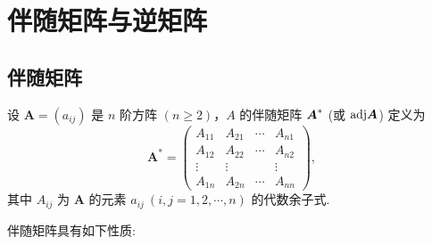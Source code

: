 \section{伴随矩阵与逆矩阵}

\subsection{伴随矩阵}

\begin{definition}[伴随矩阵]
    设 $ \boldsymbol{A}=\left(a_{i j}\right) $ 是 $ n $ 阶方阵 $ (n \geqslant 2)$，$A $ 的伴随矩阵 $\vb*{A}^*$ (或 $\mathrm{adj}\vb*{A}$) 定义为
    $$\boldsymbol{A}^{*}=\begin{pmatrix}
            A_{11}  & A_{21}  & \cdots & A_{n 1} \\
            A_{12}  & A_{22}  & \cdots & A_{n 2} \\
            \vdots  & \vdots  &        & \vdots  \\
            A_{1 n} & A_{2 n} & \cdots & A_{n n}
        \end{pmatrix},$$
    其中 $ A_{i j} $ 为 $ \boldsymbol{A} $ 的元素 $ a_{i j}~ (i, j=1,2, \cdots, n) $ 的代数余子式.
\end{definition}
伴随矩阵具有如下性质:
\setcounter{magicrownumbers}{0}
